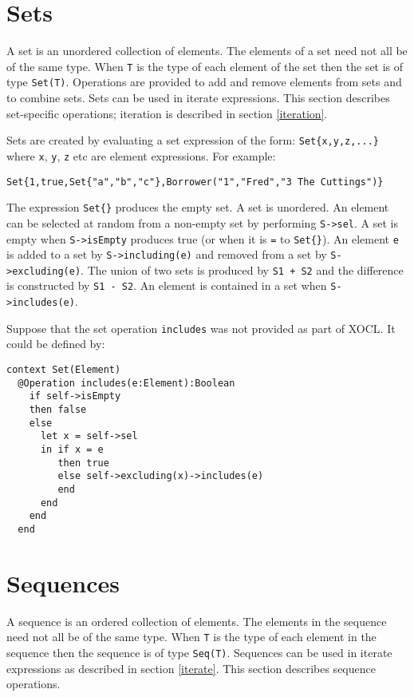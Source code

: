\documentclass{article}
\begin{document}
\section{Sets}

A set is an unordered collection of elements. The elements of a set need not all be of the same type.
When {\tt T} is the type of each element of the set then the set is of type {\tt Set(T)}. Operations
are provided to add and remove elements from sets and to combine sets. Sets can be used in iterate
expressions. This section describes set-specific operations; iteration is described in section 
\ref{iteration}.

Sets are created by evaluating a set expression of the form: {\tt Set\{x,y,z,...\}} where {\tt x},
{\tt y}, {\tt z} etc are element expressions. For example:
\begin{verbatim}
Set{1,true,Set{"a","b","c"},Borrower("1","Fred","3 The Cuttings")}
\end{verbatim}
The expression {\tt Set\{\}} produces the empty set.
A set is unordered. An element can be selected at random from a non-empty set by performing {\tt S->sel}.
A set is empty when {\tt S->isEmpty} produces true (or when it is {\tt =} to {\tt Set\{\}}).
An element {\tt e} is added to a set by {\tt S->including(e)} and removed from a set by 
{\tt S->excluding(e)}. The union of two sets is produced by {\tt S1 + S2} and the difference
is constructed by {\tt S1 - S2}. An element is contained in a set when {\tt S->includes(e)}.

Suppose that the set operation {\tt includes} was not provided as part of XOCL. It could be defined
by:
\begin{verbatim}
context Set(Element)
  @Operation includes(e:Element):Boolean
    if self->isEmpty
    then false
    else 
      let x = self->sel
      in if x = e
         then true
         else self->excluding(x)->includes(e)
         end
      end
    end
  end
\end{verbatim}

\section{Sequences}

A sequence is an ordered collection of elements. The elements in the sequence need not all be of the
same type. When {\tt T} is the type of each element in the sequence then the sequence is of type
{\tt Seq(T)}. Sequences can be used in iterate expressions as described in section \ref{iterate}.
This section describes sequence operations.
\end{document}
